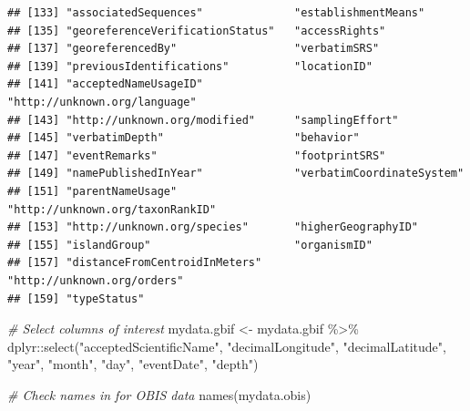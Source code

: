 \documentclass[
]{book}
\newenvironment{Shaded}{\begin{snugshade}}{\end{snugshade}}
\newcommand{\CommentTok}[1]{\textcolor[rgb]{0.56,0.35,0.01}{\textit{#1}}}
\newcommand{\FunctionTok}[1]{\textcolor[rgb]{0.00,0.00,0.00}{#1}}
\newcommand{\NormalTok}[1]{#1}
\newcommand{\OtherTok}[1]{\textcolor[rgb]{0.56,0.35,0.01}{#1}}
\newcommand{\SpecialCharTok}[1]{\textcolor[rgb]{0.00,0.00,0.00}{#1}}
\newcommand{\StringTok}[1]{\textcolor[rgb]{0.31,0.60,0.02}{#1}}
\begin{document}
\begin{verbatim}
## [133] "associatedSequences"              "establishmentMeans"              
## [135] "georeferenceVerificationStatus"   "accessRights"                    
## [137] "georeferencedBy"                  "verbatimSRS"                     
## [139] "previousIdentifications"          "locationID"                      
## [141] "acceptedNameUsageID"              "http://unknown.org/language"     
## [143] "http://unknown.org/modified"      "samplingEffort"                  
## [145] "verbatimDepth"                    "behavior"                        
## [147] "eventRemarks"                     "footprintSRS"                    
## [149] "namePublishedInYear"              "verbatimCoordinateSystem"        
## [151] "parentNameUsage"                  "http://unknown.org/taxonRankID"  
## [153] "http://unknown.org/species"       "higherGeographyID"               
## [155] "islandGroup"                      "organismID"                      
## [157] "distanceFromCentroidInMeters"     "http://unknown.org/orders"       
## [159] "typeStatus"
\end{verbatim}

\begin{Shaded}
\begin{Highlighting}[]
\CommentTok{\# Select columns of interest}
\NormalTok{mydata.gbif }\OtherTok{\textless{}{-}}\NormalTok{ mydata.gbif }\SpecialCharTok{\%\textgreater{}\%}
\NormalTok{                dplyr}\SpecialCharTok{::}\FunctionTok{select}\NormalTok{(}\StringTok{"acceptedScientificName"}\NormalTok{,}
                  \StringTok{"decimalLongitude"}\NormalTok{,}
                  \StringTok{"decimalLatitude"}\NormalTok{,}
                  \StringTok{"year"}\NormalTok{,}
                  \StringTok{"month"}\NormalTok{,}
                  \StringTok{"day"}\NormalTok{,}
                  \StringTok{"eventDate"}\NormalTok{,}
                  \StringTok{"depth"}\NormalTok{)}

\CommentTok{\# Check names in for OBIS data}
\FunctionTok{names}\NormalTok{(mydata.obis)}
\end{Highlighting}
\end{Shaded}
\end{document}
